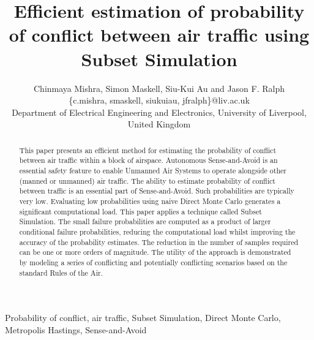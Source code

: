 \documentclass[journal]{IEEEtran}
\begin{document}
\title{Efficient estimation of probability of conflict between air traffic using Subset Simulation}


\author{
				Chinmaya Mishra, Simon Maskell, Siu-Kui Au and Jason F. Ralph\\
				\{c.mishra, smaskell, siukuiau, jfralph\}@liv.ac.uk\\
				Department of Electrical Engineering and Electronics, University of Liverpool, United Kingdom
				}






\maketitle


\begin{abstract}
This paper presents an efficient method for estimating the probability of conflict between air traffic within a block of airspace. Autonomous Sense-and-Avoid is an essential safety feature to enable Unmanned Air Systems to operate alongside other (manned or unmanned) air traffic. The ability to estimate probability of conflict between traffic is an essential part of Sense-and-Avoid. Such probabilities are typically very low. Evaluating low probabilities using naive Direct Monte Carlo generates a significant computational load. This paper applies a technique called Subset Simulation. The small failure probabilities are computed as a product of larger conditional failure probabilities, reducing the computational load whilst improving the accuracy of the probability estimates. The reduction in the number of samples required can be one or more orders of magnitude. The utility of the approach is demonstrated by modeling a series of conflicting and potentially conflicting scenarios based on the standard Rules of the Air.
\end{abstract}

\begin{IEEEkeywords}
Probability of conflict, air traffic, Subset Simulation, Direct Monte Carlo, Metropolis Hastings, Sense-and-Avoid
\end{IEEEkeywords}
\end{document}
